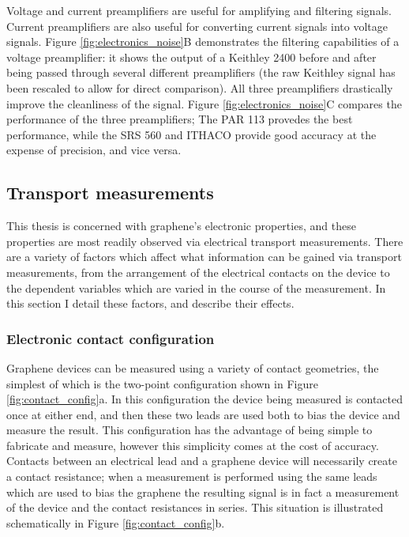 \documentclass[edeposit,fullpage,draftthesis]{uiucthesis2009}
\begin{document}
            Voltage and current preamplifiers are useful for amplifying and filtering signals. Current
            preamplifiers are also useful for converting current signals into voltage signals.
            Figure \ref{fig:electronics_noise}B demonstrates the filtering capabilities of 
            a voltage preamplifier: it shows the output of a Keithley 2400 before and after
            being passed through several different preamplifiers (the raw Keithley signal has been
            rescaled to allow for direct comparison). All three preamplifiers drastically improve
            the cleanliness of the signal. Figure \ref{fig:electronics_noise}C compares the performance
            of the three preamplifiers; The PAR 113 provedes the best performance, while the 
            SRS 560 and ITHACO provide good accuracy at the expense of precision, and vice versa.
            
            
            
       
        
        \subsection{Transport measurements}
        
        This thesis is concerned with graphene's electronic properties, and these properties are most 
        readily observed via electrical transport measurements. There are a variety of factors which 
        affect what information can be gained via transport measurements,
        from the arrangement of the electrical contacts on the device to the dependent variables which 
        are varied in the course of the measurement. In this section I detail these factors, and describe
        their effects.
        
        \subsubsection*{Electronic contact configuration}
             
       
            Graphene devices can be measured using a variety of contact geometries, the simplest of which
            is the two-point configuration shown in Figure \ref{fig:contact_config}a. In this configuration
            the device being measured is contacted once at either end, and then these two leads are used both
            to bias the device and measure the result. This configuration has the advantage of being simple
            to fabricate and measure, however this simplicity comes at the cost of accuracy. Contacts between
            an electrical lead and a graphene device will necessarily create a contact resistance; when a 
            measurement is performed using the same leads which are used to bias the graphene the resulting
            signal is in fact a measurement of the device and the contact resistances in series. This situation
            is illustrated schematically in Figure \ref{fig:contact_config}b.
            
\end{document}
